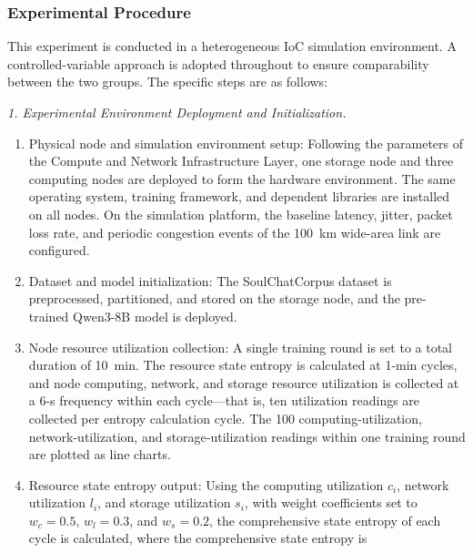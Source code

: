 \documentclass{ccjnl}
\begin{document}
\subsubsection{Experimental Procedure}
\label{s6-1-2}

This experiment is conducted in a heterogeneous IoC simulation environment. A controlled-variable approach is adopted throughout to ensure comparability between the two groups. The specific steps are as follows:

\par
{}
\noindent\textit{1. Experimental Environment Deployment and Initialization.}\par

\begin{enumerate}[nosep,label=\alph*.]
	\item Physical node and simulation environment setup:
	Following the parameters of the Compute and Network Infrastructure Layer, one storage node and three computing nodes are deployed to form the hardware environment. The same operating system, training framework, and dependent libraries are installed on all nodes. On the simulation platform, the baseline latency, jitter, packet loss rate, and periodic congestion events of the 100~km wide-area link are configured.
	
	\item Dataset and model initialization:
	The SoulChatCorpus dataset is preprocessed, partitioned, and stored on the storage node, and the pre-trained Qwen3-8B model is deployed.
	
	\item Node resource utilization collection:
	A single training round is set to a total duration of 10~min. The resource state entropy is calculated at 1-min cycles, and node computing, network, and storage resource utilization is collected at a 6-s frequency within each cycle---that is, ten utilization readings are collected per entropy calculation cycle. The 100 computing-utilization, network-utilization, and storage-utilization readings within one training round are plotted as line charts.
	
	\item Resource state entropy output:
	Using the computing utilization $c_i$, network utilization $l_i$, and storage utilization $s_i$, with weight coefficients set to $w_c=0.5$, $w_l=0.3$, and $w_s=0.2$, the comprehensive state entropy of each cycle is calculated, where the comprehensive state entropy is
\end{enumerate}
\end{document}
